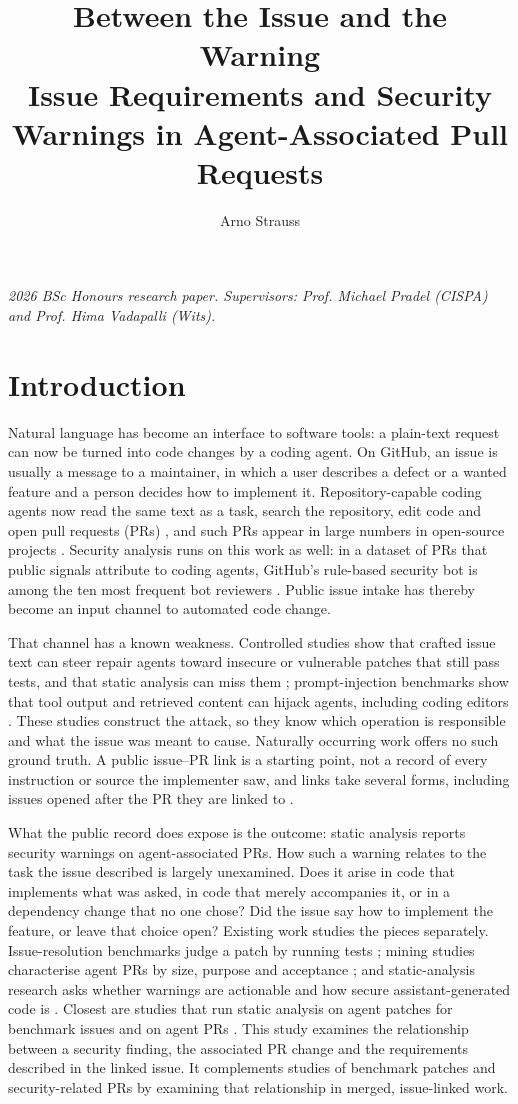 \documentclass[acmsmall,screen,nonacm]{acmart}
\title[Between the Issue and the Warning]{Between the Issue and the Warning\texorpdfstring{\\[0.25em]}{ }Issue Requirements and Security Warnings in Agent-Associated Pull Requests}
\author{Arno Strauss}
\affiliation{\institution{School of Computer Science and Applied Mathematics, University of the Witwatersrand}\city{Johannesburg}\country{South Africa}}
\begin{document}
\maketitle
\noindent\textit{2026 BSc Honours research paper. Supervisors: Prof. Michael Pradel (CISPA) and Prof. Hima Vadapalli (Wits).}

\section{Introduction}

Natural language has become an interface to software tools: a plain-text request can now be turned into code changes by a coding agent. On GitHub, an issue is usually a message to a maintainer, in which a user describes a defect or a wanted feature and a person decides how to implement it. Repository-capable coding agents now read the same text as a task, search the repository, edit code and open pull requests (PRs) \cite{b9,b20,b22,b25}, and such PRs appear in large numbers in open-source projects \cite{b11,b21}. Security analysis runs on this work as well: in a dataset of PRs that public signals attribute to coding agents, GitHub's rule-based security bot is among the ten most frequent bot reviewers \cite{b11}. Public issue intake has thereby become an input channel to automated code change.

That channel has a known weakness. Controlled studies show that crafted issue text can steer repair agents toward insecure or vulnerable patches that still pass tests, and that static analysis can miss them \cite{b3,b16}; prompt-injection benchmarks show that tool output and retrieved content can hijack agents, including coding editors \cite{b6,b12,b24}. These studies construct the attack, so they know which operation is responsible and what the issue was meant to cause. Naturally occurring work offers no such ground truth. A public issue--PR link is a starting point, not a record of every instruction or source the implementer saw, and links take several forms, including issues opened after the PR they are linked to \cite{b5}.

What the public record does expose is the outcome: static analysis reports security warnings on agent-associated PRs. How such a warning relates to the task the issue described is largely unexamined. Does it arise in code that implements what was asked, in code that merely accompanies it, or in a dependency change that no one chose? Did the issue say how to implement the feature, or leave that choice open? Existing work studies the pieces separately. Issue-resolution benchmarks judge a patch by running tests \cite{b9}; mining studies characterise agent PRs by size, purpose and acceptance \cite{b11,b21}; and static-analysis research asks whether warnings are actionable and how secure assistant-generated code is \cite{b32,b33,b34,b35}. Closest are studies that run static analysis on agent patches for benchmark issues \cite{b36} and on agent PRs \cite{b37}. This study examines the relationship between a security finding, the associated PR change and the requirements described in the linked issue. It complements studies of benchmark patches and security-related PRs by examining that relationship in merged, issue-linked work.
\end{document}
